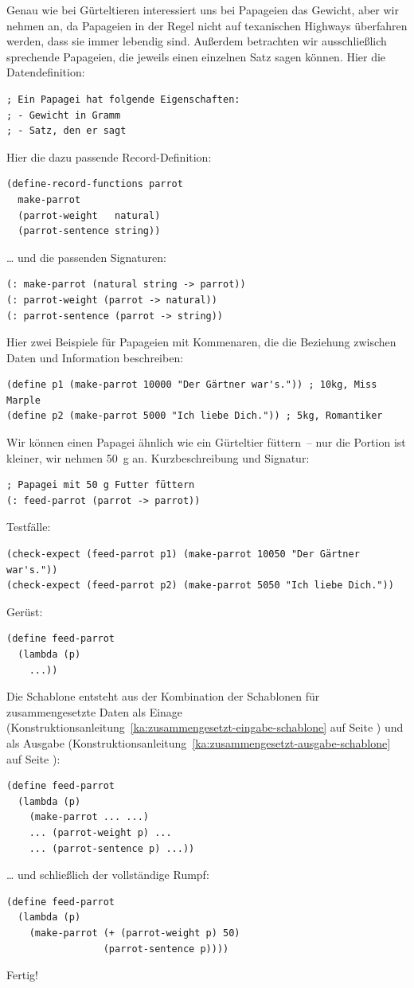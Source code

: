 Genau wie bei Gürteltieren interessiert uns bei Papageien das Gewicht,
aber wir nehmen an, da Papageien in der Regel nicht auf texanischen
Highways überfahren werden, dass sie immer lebendig sind.  Außerdem
betrachten wir ausschließlich sprechende Papageien, die jeweils einen
einzelnen Satz sagen können.  Hier die Datendefinition:
%
\begin{verbatim}
; Ein Papagei hat folgende Eigenschaften:
; - Gewicht in Gramm
; - Satz, den er sagt
\end{verbatim}
%
Hier die dazu passende Record-Definition:
%
\begin{verbatim}
(define-record-functions parrot
  make-parrot
  (parrot-weight   natural)
  (parrot-sentence string))
\end{verbatim}
%
\ldots{} und die passenden Signaturen:
%
\begin{verbatim}
(: make-parrot (natural string -> parrot))
(: parrot-weight (parrot -> natural))
(: parrot-sentence (parrot -> string))
\end{verbatim}
%
Hier zwei Beispiele für Papageien mit Kommenaren, die die Beziehung
zwischen Daten und Information beschreiben:
%
\begin{verbatim}
(define p1 (make-parrot 10000 "Der Gärtner war's.")) ; 10kg, Miss Marple
(define p2 (make-parrot 5000 "Ich liebe Dich.")) ; 5kg, Romantiker 
\end{verbatim}
%
Wir können einen Papagei ähnlich wie ein Gürteltier füttern~-- nur die
Portion ist kleiner, wir nehmen 50~g an.  Kurzbeschreibung und Signatur:
%
\begin{verbatim}
; Papagei mit 50 g Futter füttern
(: feed-parrot (parrot -> parrot))
\end{verbatim}
%
Testfälle:
%
\begin{verbatim}
(check-expect (feed-parrot p1) (make-parrot 10050 "Der Gärtner war's."))
(check-expect (feed-parrot p2) (make-parrot 5050 "Ich liebe Dich."))
\end{verbatim}
%
Gerüst:
%
\begin{verbatim}
(define feed-parrot
  (lambda (p)
    ...))
\end{verbatim}
%
Die Schablone entsteht aus der Kombination der Schablonen für
zusammengesetzte Daten
als Einage (Konstruktionsanleitung~\ref{ka:zusammengesetzt-eingabe-schablone} auf
Seite \pageref{ka:zusammengesetzt-eingabe-schablone}) und als Ausgabe
(Konstruktionsanleitung~\ref{ka:zusammengesetzt-ausgabe-schablone} auf
Seite \pageref{ka:zusammengesetzt-ausgabe-schablone}):
%
\begin{verbatim}
(define feed-parrot
  (lambda (p)
    (make-parrot ... ...)
    ... (parrot-weight p) ...
    ... (parrot-sentence p) ...))
\end{verbatim}
%
\ldots{} und schließlich der vollständige Rumpf:
%
\begin{verbatim}
(define feed-parrot
  (lambda (p)
    (make-parrot (+ (parrot-weight p) 50)
                 (parrot-sentence p))))
\end{verbatim}
%
Fertig!

